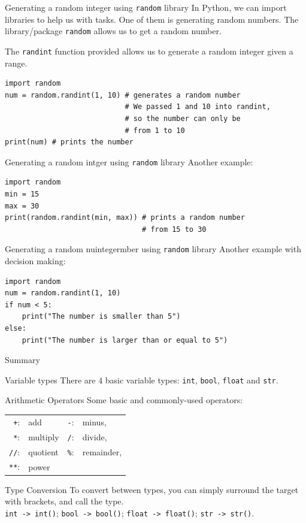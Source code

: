 \documentclass[dvipsnames, svgnames, x11names, handout]{beamer}
\begin{document}
\begin{frame}[fragile]{Generating a random integer using \texttt{random} library}
In Python, we can import libraries to help us with tasks. One of them is generating random numbers.
The library/package \texttt{random} allows us to get a random number.

The \texttt{randint} function provided allows us to generate a random integer given a range.
\begin{verbatim}
import random
num = random.randint(1, 10) # generates a random number
							# We passed 1 and 10 into randint,
							# so the number can only be 
							# from 1 to 10
print(num) # prints the number
\end{verbatim}
\end{frame}

\begin{frame}[fragile]{Generating a random intger using \texttt{random} library}
Another example:
\begin{verbatim}
import random
min = 15
max = 30
print(random.randint(min, max)) # prints a random number 
								# from 15 to 30
\end{verbatim}
\end{frame}

\begin{frame}[fragile]{Generating a random nuintegermber using \texttt{random} library}
Another example with decision making:
\begin{verbatim}
import random
num = random.randint(1, 10)
if num < 5:
	print("The number is smaller than 5")
else:
	print("The number is larger than or equal to 5")
\end{verbatim}
\end{frame}


\begin{frame}[fragile]{Summary}
\begin{block}{Variable types}
There are 4 basic variable types: \texttt{int}, \texttt{bool}, \texttt{float} and \texttt{str}.
\end{block}
\begin{block}{Arithmetic Operators}
Some basic and commonly-used operators:\\
\centering
\begin{tabular}{rlrl}
\texttt{+}:& add & \texttt{-}:& minus,\\
\texttt{*}:& multiply & \texttt{/}:& divide,\\
\texttt{//}:& quotient & \texttt{\%}:& remainder,\\
\texttt{**}:& power &&
\end{tabular}
\end{block}

\begin{block}{Type Conversion}
To convert between types, you can simply surround the target with brackets, and call the type.\\
\texttt{int -> int()}; \texttt{bool -> bool()}; \texttt{float -> float()}; \texttt{str -> str()}.
\end{block}
\end{frame}
\end{document}
